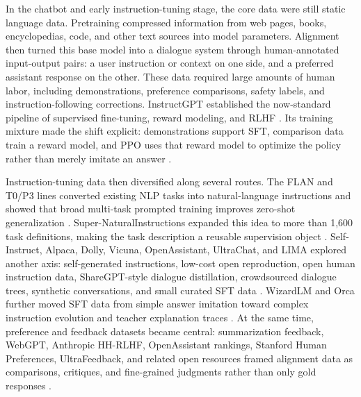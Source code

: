 In the chatbot and early instruction-tuning stage, the core data were still static language data. Pretraining compressed information from web pages, books, encyclopedias, code, and other text sources into model parameters. Alignment then turned this base model into a dialogue system through human-annotated input-output pairs: a user instruction or context on one side, and a preferred assistant response on the other. These data required large amounts of human labor, including demonstrations, preference comparisons, safety labels, and instruction-following corrections. InstructGPT established the now-standard pipeline of supervised fine-tuning, reward modeling, and RLHF \citep{ouyang2022training}. Its training mixture made the shift explicit: demonstrations support SFT, comparison data train a reward model, and PPO uses that reward model to optimize the policy rather than merely imitate an answer \citep{schulman2017proximal,ouyang2022training,fan2025ppc,seff2023motionlm,du2026trajagent,wang2024prompt,ma2026survey,lambert2024tulu,dubois2023alpacafarm,yuan2024self,kim2023aligning}.

Instruction-tuning data then diversified along several routes. The FLAN and T0/P3 lines converted existing NLP tasks into natural-language instructions and showed that broad multi-task prompted training improves zero-shot generalization \citep{wei2021finetuned,sanh2022multitask,longpre2023flan}. Super-NaturalInstructions expanded this idea to more than 1,600 task definitions, making the task description a reusable supervision object \citep{wang2022supernaturalinstructions}. Self-Instruct, Alpaca, Dolly, Vicuna, OpenAssistant, UltraChat, and LIMA explored another axis: self-generated instructions, low-cost open reproduction, open human instruction data, ShareGPT-style dialogue distillation, crowdsourced dialogue trees, synthetic conversations, and small curated SFT data \citep{wang2022selfinstruct,taori2023stanford,databricks2023dolly15k,vicuna2023lmsys,kopf2023openassistant,ding2023ultrachat,zhou2023lima}. WizardLM and Orca further moved SFT data from simple answer imitation toward complex instruction evolution and teacher explanation traces \citep{xu2023wizardlm,mukherjee2023orca}. At the same time, preference and feedback datasets became central: summarization feedback, WebGPT, Anthropic HH-RLHF, OpenAssistant rankings, Stanford Human Preferences, UltraFeedback, and related open resources framed alignment data as comparisons, critiques, and fine-grained judgments rather than only gold responses \citep{stiennon2022summarize,nakano2022webgpt,bai2022training,kopf2023openassistant,ethayarajh2022shp,cui2024ultrafeedback,wang2023camels,lu2024mental,sun2024interactive,xiagentgym,zheng2025trajectory,puthumanaillam2025trace,zhao2023slic,yuan2023rrhf,singhal2023long,zheng2023secrets,zhang-etal-2025-cchall,chen-etal-2024-m3cot,chen2026omibenchbenchmarkingolympiadlevelmultiimage,cheng2025comt}.

